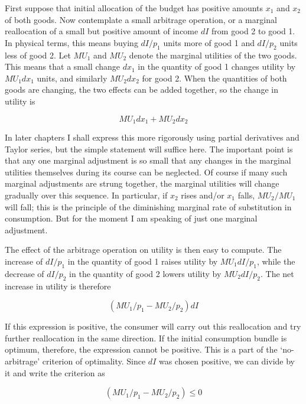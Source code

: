 First suppose that initial allocation of the budget has positive amounts $x_1$ and $x_2$ of both goods. Now contemplate a small arbitrage operation, or a marginal reallocation of a small but positive amount of income $dI$ from good 2 to good 1. In physical terms, this means buying $dI/p_1$ units more of good 1 and $dI/p_2$ units less of good 2. Let $MU_1$ and $MU_2$ denote the marginal utilities of the two goods. This means that a small change $dx_1$ in the quantity of good 1 changes utility by $MU_1 dx_1$ units, and similarly $MU_2 dx_2$ for good 2. When the quantities of both goods are changing, the two effects can be added together, so the change in utility is

\begin{equation}\label{equa1.3}
MU_1 dx_1 + MU_2 dx_2
\end{equation} 

In later chapters I shall express this more rigorously using partial derivatives and Taylor series, but the simple statement will suffice here. The important point is that any one marginal adjustment is so small that any changes in the marginal utilities themselves during its course can be neglected. Of course if many such marginal adjustments are strung together, the marginal utilities will change gradually over this sequence. In particular, if $x_2$ rises and/or $x_1$ falls, $MU_2/MU_1$ will fall; this is the principle of the diminishing marginal rate of substitution in consumption. But for the moment I am speaking of just one marginal adjustment. 

The effect of the arbitrage operation on utility is then easy to compute. The increase of $dI/p_1$ in the quantity of good 1 raises utility by $MU_1 dI/p_1$, while the decrease of $dI/p_2$ in the quantity of good 2 lowers utility by $MU_2 dI/p_2$. The net increase in utility is therefore

\begin{equation*}
(MU_1 /p_1 - MU_2 /p_2) dI
\end{equation*} 

If this expression is positive, the consumer will carry out this reallocation and try further reallocation in the same direction. If the initial consumption bundle is optimum, therefore, the expression cannot be positive. This is a part of the `no-arbitrage' criterion of optimality. Since $dI$ was chosen positive, we can divide by it and write the criterion as 

\begin{equation}\label{equa1.4}
(MU_1 /p_1 - MU_2 /p_2) \leq 0
\end{equation} 

